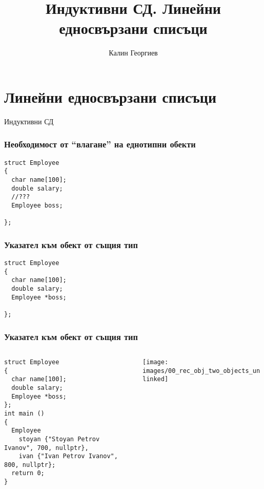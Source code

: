 \documentclass{beamer}
\begin{document}
\title[Обектно ориентирано програмиране]{Индуктивни СД. Линейни едносвързани списъци} 
\author{Калин Георгиев} 
\frame{\titlepage} 

\section{Линейни едносвързани списъци} 


\begin{frame}
\centerline{Индуктивни СД}
\end{frame}


\begin{frame}[fragile]
\frametitle{Необходимост от ``влагане'' на еднотипни обекти}
\begin{flushleft}
\begin{lstlisting}
struct Employee
{
  char name[100];
  double salary;
  //???
  Employee boss;

};
\end{lstlisting}  
\end{flushleft}
\end{frame}


\begin{frame}[fragile]
\frametitle{Указател към обект от същия тип}
\begin{flushleft}
\begin{lstlisting}
struct Employee
{
  char name[100];
  double salary;
  Employee *boss;

};
\end{lstlisting}  
\end{flushleft}
\end{frame}


\begin{frame}[fragile]
\frametitle{Указател към обект от същия тип}

\begin{columns}[c]
  \begin{column}{0.55\textwidth}
\begin{flushleft}
\begin{lstlisting}
struct Employee
{
  char name[100];
  double salary;
  Employee *boss;
};
int main ()
{
  Employee 
    stoyan {"Stoyan Petrov Ivanov", 700, nullptr},
    ivan {"Ivan Petrov Ivanov", 800, nullptr};
  return 0;
}

\end{lstlisting}  
\end{flushleft}

  \end{column}
  \begin{column}{0.45\textwidth}
\hspace{-100px}
\texttt{[image: images/00\_rec\_obj\_two\_objects\_unlinked]}

  \end{column}
\end{columns}
\end{frame}
\end{document}
